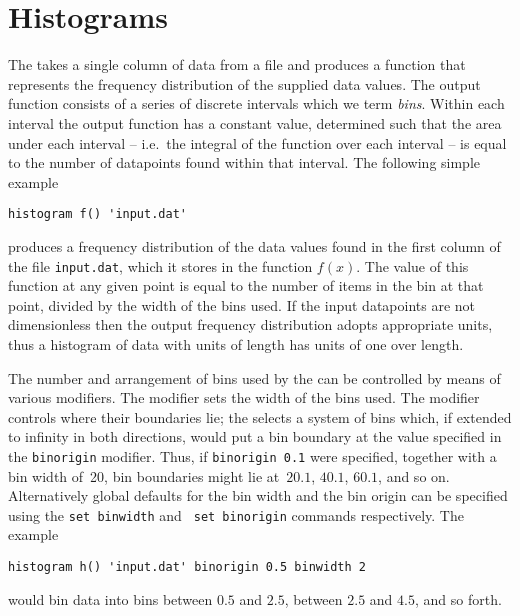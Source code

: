 \section{Histograms}
\label{sec:histogram}

The  takes a single column of data from a file and produces
a function that represents the frequency distribution of the supplied data
values. The output function consists of a series of discrete intervals which we
term {\it bins}. Within each interval the output function has a constant value,
determined such that the area under each interval -- i.e.\ the integral of the
function over each interval -- is equal to the number of datapoints found
within that interval.  The following simple example

\begin{verbatim}
histogram f() 'input.dat'
\end{verbatim}

\noindent produces a frequency distribution of the data values found in the
first column of the file {\tt input.dat}, which it stores in the function
$f(x)$. The value of this function at any given point is equal to the number of
items in the bin at that point, divided by the width of the bins used. If the
input datapoints are not dimensionless then the output frequency distribution
adopts appropriate units, thus a histogram of data with units of length has
units of one over length.

The number and arrangement of bins used by the  can be
controlled by means of various modifiers.  The  modifier sets
the width of the bins used. The  modifier controls where
their boundaries lie; the  selects a system of bins which,
if extended to infinity in both directions, would put a bin boundary at the
value specified in the {\tt binorigin} modifier. Thus, if {\tt binorigin 0.1}
were specified, together with a bin width of~20, bin boundaries might lie
at~$20.1$, $40.1$, $60.1$, and so on. Alternatively global defaults for the bin
width and the bin origin can be specified using the {\tt set binwidth} and {\tt
set binorigin} commands respectively. The example

\begin{verbatim}
histogram h() 'input.dat' binorigin 0.5 binwidth 2
\end{verbatim}

\noindent would bin data into bins between $0.5$ and $2.5$, between $2.5$ and
$4.5$, and so forth.

